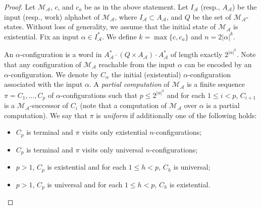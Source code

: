 \begin{proof}
Let $\mathcal{M}_{\mathcal{A}}$, $c$, and $c_a$ be as in the above statement. Let $I_{\mathcal{A}}$ (resp., $A_{\mathcal{A}}$) be the input (resp., work) alphabet of $\mathcal{M}_{\mathcal{A}}$, where $I_{\mathcal{A}}\subset A_{\mathcal{A}}$, and $Q$ be the set of $\mathcal{M}_{\mathcal{A}}$-states.
Without loss of generality, we assume that the initial state of $\mathcal{M}_{\mathcal{A}}$ is existential.
Fix an input $\alpha\in I_{\mathcal{A}}^{*}$. We define $k= \max\{c,c_a\}$ and $n= 2|\alpha|^{k}$.

An $\alpha$-configuration is a word in $A_{\mathcal{A}}^{*}\cdot (Q\times A_{\mathcal{A}})\cdot A_{\mathcal{A}}^{*}$ of length exactly $2^{|\alpha|^{k}}$. Note that any configuration of $\mathcal{M}_{\mathcal{A}}$ reachable from the input $\alpha$ can be encoded by an $\alpha$-configuration. We denote by $C_\alpha$  the initial (existential) $\alpha$-configuration associated with the input $\alpha$. A \emph{partial computation} of $\mathcal{M}_{\mathcal{A}}$ is a finite sequence $\pi=C_1,\ldots,C_p$ of $\alpha$-configurations such that
 $p\leq 2^{|\alpha|^{k}}$ and for each $1\leq i<p$, $C_{i+1}$ is a $\mathcal{M}_{\mathcal{A}}$-successor of $C_i$ (note that a computation of $\mathcal{M}_{\mathcal{A}}$ over $\alpha$ is a partial computation).
We say that $\pi$ is \emph{uniform} if additionally one of the following holds:
\begin{itemize}
  \item $C_p$ is terminal and $\pi$ visits only existential $n$-configurations;
  \item $C_p$ is terminal and $\pi$ visits only universal $n$-configurations;
  \item $p>1$, $C_p$ is existential and for each $1\leq h<p$, $C_h$ is universal;
  \item $p>1$, $C_p$ is universal and for each $1\leq h<p$, $C_h$ is existential.
\end{itemize}


\end{proof}
